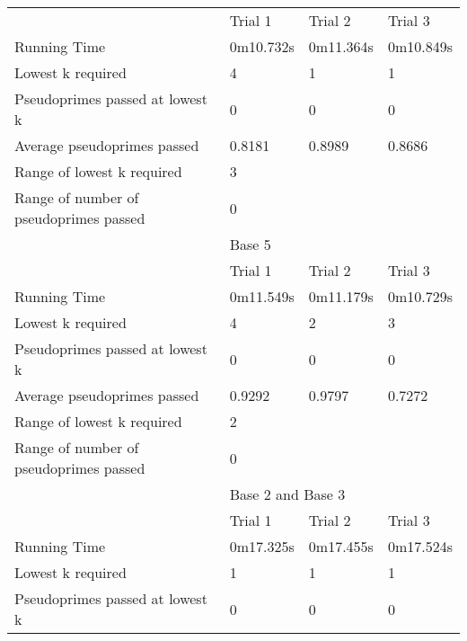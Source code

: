 \documentclass{article}
\begin{document}
\begin{appendices}
\begin{longtable}{llll}
\midrule
                                       & Trial 1   & Trial 2   & Trial 3        \\
Running Time                           & 0m10.732s & 0m11.364s & 0m10.849s      \\
Lowest k required                      & 4         & 1         & 1              \\
Pseudoprimes passed at lowest k        & 0         & 0         & 0              \\
Average pseudoprimes passed            & 0.8181    & 0.8989    & 0.8686         \\
\cmidrule(lr){2-2}\cmidrule(lr){3-3}\cmidrule(lr){4-4}
Range of lowest k required             & \multicolumn{3}{l}{3}                  \\
Range of number of pseudoprimes passed & \multicolumn{3}{l}{0}                  \\
\midrule
                                       & \multicolumn{3}{l}{Base 5}             \\
\midrule
                                       & Trial 1   & Trial 2   & Trial 3        \\
Running Time                           & 0m11.549s & 0m11.179s & 0m10.729s      \\
Lowest k required                      & 4         & 2         & 3              \\
Pseudoprimes passed at lowest k        & 0         & 0         & 0              \\
Average pseudoprimes passed            & 0.9292    & 0.9797    & 0.7272         \\
\cmidrule(lr){2-2}\cmidrule(lr){3-3}\cmidrule(lr){4-4}
Range of lowest k required             & \multicolumn{3}{l}{2}                  \\
Range of number of pseudoprimes passed & \multicolumn{3}{l}{0}                  \\
\midrule
                                       & \multicolumn{3}{l}{Base 2 and Base 3}  \\
\midrule
                                       & Trial 1   & Trial 2   & Trial 3        \\
Running Time                           & 0m17.325s & 0m17.455s & 0m17.524s      \\
Lowest k required                      & 1         & 1         & 1              \\
Pseudoprimes passed at lowest k        & 0         & 0         & 0              \\

\end{longtable}
\end{appendices}
\end{document}

